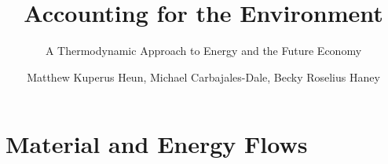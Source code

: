 \documentclass[graybox,envcountchap,sectrefs]{svmono}
\begin{document}
\author{Matthew Kuperus Heun, Michael Carbajales-Dale, Becky Roselius Haney}
\title{Accounting for the Environment}
\subtitle{A Thermodynamic Approach to Energy and the Future Economy}
\maketitle{}

\glsaddall[types={nomenclature,glossary}]

\frontmatter%

%
%
%
%



\tableofcontents{}
\listoffigures{}
\listoftables{}


\printglossary[type=nomenclature, style=nomenclaturestyle, nonumberlist=true]

 



\setcounter{chapter}{0}

\mainmatter%




\part{Material and Energy Flows}
\label{part:matter}




\end{document}
